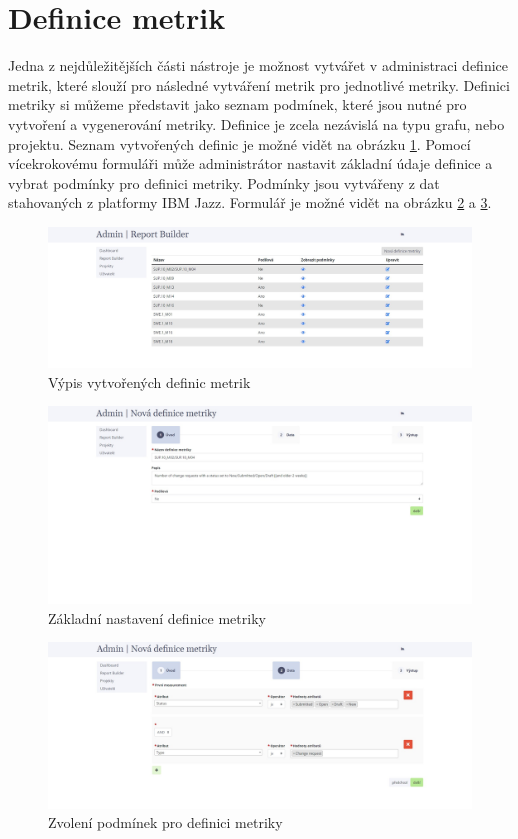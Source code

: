 \documentclass[czech,master]{diploma}
\begin{document}
\section{Definice metrik}
Jedna z nejdůležitějších části nástroje je možnost vytvářet v administraci definice metrik, které slouží pro následné vytváření metrik pro jednotlivé metriky. Definici metriky si můžeme představit jako seznam podmínek, které jsou nutné pro vytvoření a vygenerování metriky. Definice je zcela nezávislá na typu grafu, nebo projektu. Seznam vytvořených definic je možné vidět na obrázku \ref{fig:admin_report_builder}. Pomocí vícekrokovému formuláři může administrátor nastavit základní údaje definice a vybrat podmínky pro definici metriky. Podmínky jsou vytvářeny z dat stahovaných z platformy IBM Jazz. Formulář je možné vidět na obrázku \ref{fig:admin_report_builder_first_first} a \ref{fig:admin_report_builder_second}.

\begin{figure}[!ht]
    \centering
    \includegraphics[width=1\textwidth]{Diplomka/Figures/metrics_tool/admin_report_builder.jpg}
    \caption{Výpis vytvořených definic metrik}
    \label{fig:admin_report_builder}
\end{figure}

\begin{figure}[!ht]
    \centering
    \includegraphics[width=1\textwidth]{Diplomka/Figures/metrics_tool/admin_report_builder_first.jpg}
    \caption{Základní nastavení definice metriky}
    \label{fig:admin_report_builder_first_first}
\end{figure}

\begin{figure}[!ht]
    \centering
    \includegraphics[width=1\textwidth]{Diplomka/Figures/metrics_tool/admin_report_builder_second.jpg}
    \caption{Zvolení podmínek pro definici metriky}
    \label{fig:admin_report_builder_second}
\end{figure}
\end{document}
